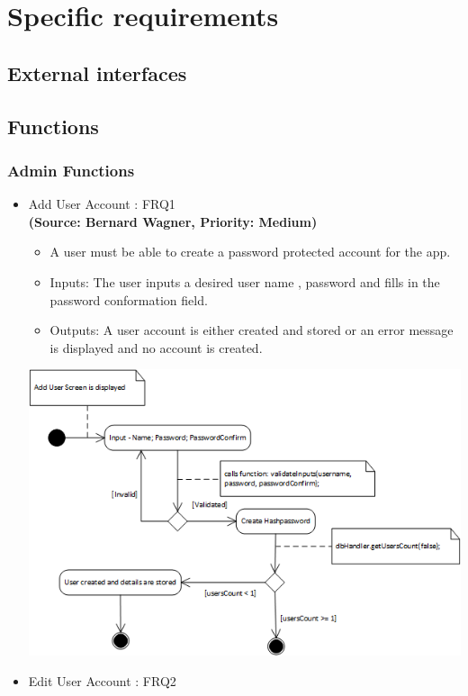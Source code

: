 \section{Specific requirements}

\subsection{External interfaces}

\subsection{Functions}
\subsubsection{Admin Functions}
\begin{itemize}
\item{Add User Account : FRQ1}\\
\textbf{(Source: Bernard Wagner, Priority: Medium)}
\begin{itemize}
\item A user must be able to create a password protected account for the app.
\item Inputs: The user inputs a desired user name , password and fills in the password conformation field.
\item Outputs: A user account is either created and stored or an error message is displayed and no account is created.
\end{itemize}
 \includegraphics[width=13cm]{diagrams/StateDiagrams/AddUserStateDiagram.png}
\item{Edit User Account : FRQ2}\\

\end{itemize}
